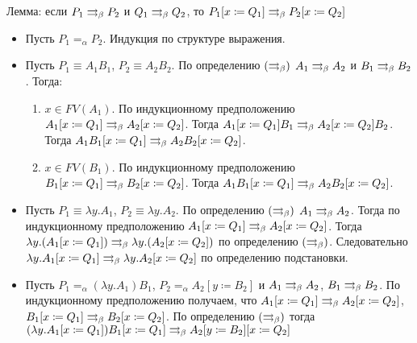 \documentclass[aspectratio=169]{beamer}
\begin{document}
\begin{frame}{Лемма: если $P_{1}\rightrightarrows_{\beta} P_{2}$ и $Q_{1}\rightrightarrows_{\beta} Q_{2}$, то $P_{1}[x\coloneqq{}Q_{1}]\rightrightarrows_{\beta} P_{2}[x\coloneqq{}Q_{2}]$}
	\begin{itemize}
		\item Пусть $P_{1}=_{\alpha}P_{2}$. Индукция по структуре выражения.
		\item Пусть $P_{1}\equiv{}A_{1}B_{1}$, $P_{2}\equiv{}A_{2}B_{2}$. По определению $(\rightrightarrows_{\beta})$ $A_{1} \rightrightarrows_{\beta} A_{2}$ и $B_{1} \rightrightarrows_{\beta} B_{2}$. Тогда:
		\begin{enumerate}
			\item $x \in FV(A_{1})$. По индукционному предположению $A_{1}[x\coloneqq{}Q_{1}] \rightrightarrows_{\beta} A_{2}[x\coloneqq{}Q_{2}]$. Тогда $A_{1}[x\coloneqq{}Q_{1}]B_{1} \rightrightarrows_{\beta} A_{2}[x\coloneqq{}Q_{2}]B_{2}$. Тогда $A_{1}B_{1}[x\coloneqq{}Q_{1}] \rightrightarrows_{\beta} A_{2}B_{2}[x\coloneqq{}Q_{2}]$.
			\item $x \in FV(B_{1})$. По индукционному предположению $B_{1}[x\coloneqq{}Q_{1}] \rightrightarrows_{\beta} B_{2}[x\coloneqq{}Q_{2}]$. Тогда $A_{1}B_{1}[x\coloneqq{}Q_{1}] \rightrightarrows_{\beta} A_{2}B_{2}[x\coloneqq{}Q_{2}]$.
		\end{enumerate}
		\item Пусть $P_{1}\equiv{}\lambda{}y.A_{1}$, $P_{2}\equiv{}\lambda{}y.A_{2}$. По определению $(\rightrightarrows_{\beta})$ $A_{1}\rightrightarrows_{\beta} A_{2}$. Тогда по индукционному предположению $A_{1}[x\coloneqq{}Q_{1}] \rightrightarrows_{\beta} A_{2}[x\coloneqq{}Q_{2}]$. Тогда 
		$\lambda{}y.(A_{1}[x\coloneqq{}Q_{1}]) \rightrightarrows_{\beta} \lambda{}y.(A_{2}[x\coloneqq{}Q_{2}])$ по определению $(\rightrightarrows_{\beta})$. Следовательно 	$\lambda{}y.A_{1}[x\coloneqq{}Q_{1}] \rightrightarrows_{\beta} \lambda{}y.A_{2}[x\coloneqq{}Q_{2}]$ по определению подстановки.
		\item Пусть $P_{1}=_\alpha(\lambda{}y.A_1)B_1$, $P_{2}=_\alpha A_2[y\coloneqq{}B_2]$ и $ A_1 \rightrightarrows_{\beta} A_2 $, $ B_1 \rightrightarrows_{\beta} B_2 $. По индукционному предположению получаем, что $A_1[x \coloneqq Q_1] \rightrightarrows_{\beta} A_2[x \coloneqq Q_2]$, $B_1[x \coloneqq Q_1] \rightrightarrows_{\beta} B_2[x \coloneqq Q_2]$. 
               По определению $(\rightrightarrows_{\beta})$ тогда $ (\lambda{}y.A_1[x\coloneqq Q_1])B_1[x \coloneqq Q_1] \rightrightarrows_{\beta}  A_2[y \coloneqq B_2][x \coloneqq Q_2]$
	\end{itemize}
\end{frame}
\end{document}
